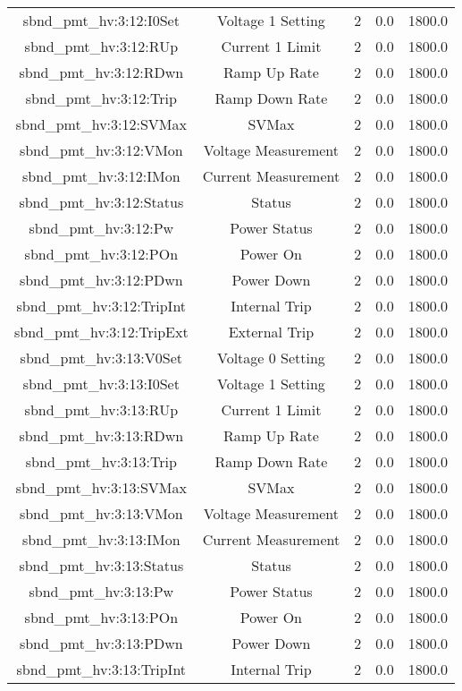 \begin{center}
\begin{longtable}{c | c c c c }
sbnd\_pmt\_hv:3:12:I0Set & Voltage 1 Setting & 2 & 0.0 & 1800.0\\ 
sbnd\_pmt\_hv:3:12:RUp & Current 1 Limit & 2 & 0.0 & 1800.0\\ 
sbnd\_pmt\_hv:3:12:RDwn & Ramp Up Rate & 2 & 0.0 & 1800.0\\ 
sbnd\_pmt\_hv:3:12:Trip & Ramp Down Rate & 2 & 0.0 & 1800.0\\ 
sbnd\_pmt\_hv:3:12:SVMax & SVMax & 2 & 0.0 & 1800.0\\ 
sbnd\_pmt\_hv:3:12:VMon & Voltage Measurement & 2 & 0.0 & 1800.0\\ 
sbnd\_pmt\_hv:3:12:IMon & Current Measurement & 2 & 0.0 & 1800.0\\ 
sbnd\_pmt\_hv:3:12:Status & Status & 2 & 0.0 & 1800.0\\ 
sbnd\_pmt\_hv:3:12:Pw & Power Status & 2 & 0.0 & 1800.0\\ 
sbnd\_pmt\_hv:3:12:POn & Power On & 2 & 0.0 & 1800.0\\ 
sbnd\_pmt\_hv:3:12:PDwn & Power Down & 2 & 0.0 & 1800.0\\ 
sbnd\_pmt\_hv:3:12:TripInt & Internal Trip & 2 & 0.0 & 1800.0\\ 
sbnd\_pmt\_hv:3:12:TripExt & External Trip & 2 & 0.0 & 1800.0\\ 
sbnd\_pmt\_hv:3:13:V0Set & Voltage 0 Setting & 2 & 0.0 & 1800.0\\ 
sbnd\_pmt\_hv:3:13:I0Set & Voltage 1 Setting & 2 & 0.0 & 1800.0\\ 
sbnd\_pmt\_hv:3:13:RUp & Current 1 Limit & 2 & 0.0 & 1800.0\\ 
sbnd\_pmt\_hv:3:13:RDwn & Ramp Up Rate & 2 & 0.0 & 1800.0\\ 
sbnd\_pmt\_hv:3:13:Trip & Ramp Down Rate & 2 & 0.0 & 1800.0\\ 
sbnd\_pmt\_hv:3:13:SVMax & SVMax & 2 & 0.0 & 1800.0\\ 
sbnd\_pmt\_hv:3:13:VMon & Voltage Measurement & 2 & 0.0 & 1800.0\\ 
sbnd\_pmt\_hv:3:13:IMon & Current Measurement & 2 & 0.0 & 1800.0\\ 
sbnd\_pmt\_hv:3:13:Status & Status & 2 & 0.0 & 1800.0\\ 
sbnd\_pmt\_hv:3:13:Pw & Power Status & 2 & 0.0 & 1800.0\\ 
sbnd\_pmt\_hv:3:13:POn & Power On & 2 & 0.0 & 1800.0\\ 
sbnd\_pmt\_hv:3:13:PDwn & Power Down & 2 & 0.0 & 1800.0\\ 
sbnd\_pmt\_hv:3:13:TripInt & Internal Trip & 2 & 0.0 & 1800.0\\ 

\end{longtable}
\end{center}
